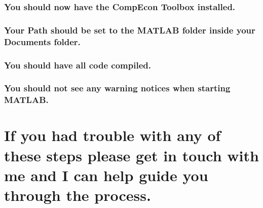 \documentclass[
]{article}
\begin{document}
\hypertarget{you-should-now-have-the-compecon-toolbox-installed.}{%
\subsubsection{You should now have the CompEcon Toolbox
installed.}\label{you-should-now-have-the-compecon-toolbox-installed.}}

\hypertarget{your-path-should-be-set-to-the-matlab-folder-inside-your-documents-folder.}{%
\subsubsection{Your Path should be set to the MATLAB folder inside your
Documents
folder.}\label{your-path-should-be-set-to-the-matlab-folder-inside-your-documents-folder.}}

\hypertarget{you-should-have-all-code-compiled.}{%
\subsubsection{You should have all code
compiled.}\label{you-should-have-all-code-compiled.}}

\hypertarget{you-should-not-see-any-warning-notices-when-starting-matlab.}{%
\subsubsection{You should not see any warning notices when starting
MATLAB.}\label{you-should-not-see-any-warning-notices-when-starting-matlab.}}

\bigskip
\bigskip

\centering

\hypertarget{if-you-had-trouble-with-any-of-these-steps-please-get-in-touch-with-me-and-i-can-help-guide-you-through-the-process.}{%
\section{If you had trouble with any of these steps please get in touch
with me and I can help guide you through the
process.}\label{if-you-had-trouble-with-any-of-these-steps-please-get-in-touch-with-me-and-i-can-help-guide-you-through-the-process.}}
\end{document}
